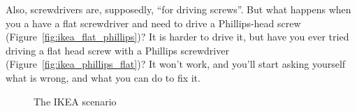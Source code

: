 \documentclass{article}
\begin{document}
Also, screwdrivers are, supposedly, ``for driving screws''. But what happens
when you a have a flat screwdriver and need to drive a Phillips-head screw
(Figure~\ref{fig:ikea_flat_phillips})? It is harder to drive it, but have you
ever tried driving a flat head screw with a Phillips screwdriver
(Figure~\ref{fig:ikea_phillips_flat})? It won't work, and you'll start asking
yourself what is wrong, and what you can do to fix it.

\begin{figure}[h]
  \centering
  \qquad
  \caption{The IKEA scenario}
\end{figure}
\end{document}
